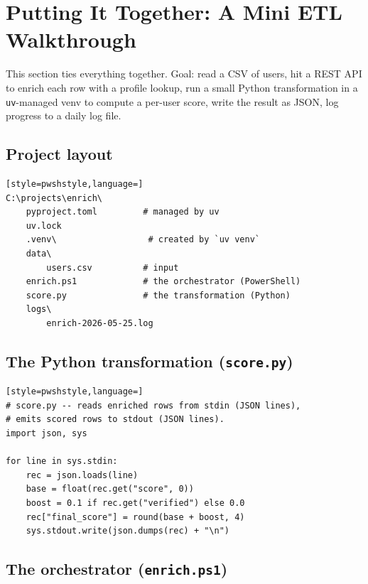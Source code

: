\documentclass[11pt,a4paper]{article}
\begin{document}
\section{Putting It Together: A Mini ETL Walkthrough}

This section ties everything together. Goal: read a CSV of users, hit a
REST API to enrich each row with a profile lookup, run a small Python
transformation in a \texttt{uv}-managed venv to compute a per-user
score, write the result as JSON, log progress to a daily log file.

\subsection*{Project layout}

\begin{lstlisting}[style=pwshstyle,language=]
C:\projects\enrich\
    pyproject.toml         # managed by uv
    uv.lock
    .venv\                  # created by `uv venv`
    data\
        users.csv          # input
    enrich.ps1             # the orchestrator (PowerShell)
    score.py               # the transformation (Python)
    logs\
        enrich-2026-05-25.log
\end{lstlisting}

\subsection*{The Python transformation (\texttt{score.py})}

\begin{lstlisting}[style=pwshstyle,language=]
# score.py -- reads enriched rows from stdin (JSON lines),
# emits scored rows to stdout (JSON lines).
import json, sys

for line in sys.stdin:
    rec = json.loads(line)
    base = float(rec.get("score", 0))
    boost = 0.1 if rec.get("verified") else 0.0
    rec["final_score"] = round(base + boost, 4)
    sys.stdout.write(json.dumps(rec) + "\n")
\end{lstlisting}

\subsection*{The orchestrator (\texttt{enrich.ps1})}
\end{document}
